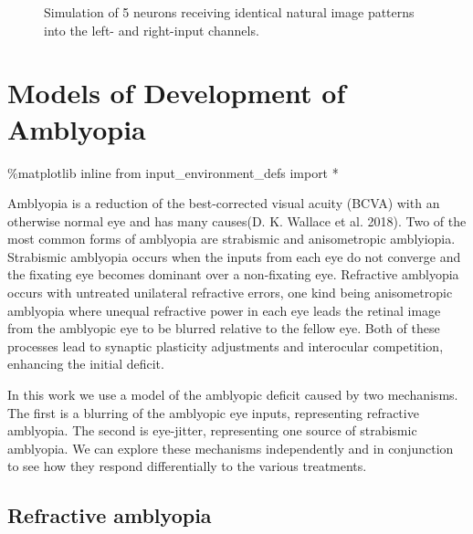 \documentclass[
  letterpaper,
  DIV=11,
  numbers=noendperiod]{scrreprt}
\newenvironment{Shaded}{\begin{snugshade}}{\end{snugshade}}
\newcommand{\ImportTok}[1]{\textcolor[rgb]{0.00,0.46,0.62}{#1}}
\newcommand{\NormalTok}[1]{\textcolor[rgb]{0.00,0.23,0.31}{#1}}
\newcommand{\OperatorTok}[1]{\textcolor[rgb]{0.37,0.37,0.37}{#1}}
\begin{document}
\begin{figure}
\begin{minipage}[t]{\linewidth}
{{}

}

\end{minipage}%

\caption{\label{fig-nr_sim}Simulation of 5 neurons receiving identical
natural image patterns into the left- and right-input channels.}

\end{figure}

\hypertarget{sec-models-of-development}{%
\chapter{Models of Development of
Amblyopia}\label{sec-models-of-development}}

\begin{Shaded}
\begin{Highlighting}[]
\OperatorTok{\%}\NormalTok{matplotlib inline}
\ImportTok{from}\NormalTok{ input\_environment\_defs }\ImportTok{import} \OperatorTok{*}
\end{Highlighting}
\end{Shaded}

Amblyopia is a reduction of the best-corrected visual acuity (BCVA) with
an otherwise normal eye and has many causes(D. K. Wallace et al. 2018).
Two of the most common forms of amblyopia are strabismic and
anisometropic amblyiopia. Strabismic amblyopia occurs when the inputs
from each eye do not converge and the fixating eye becomes dominant over
a non-fixating eye. Refractive amblyopia occurs with untreated
unilateral refractive errors, one kind being anisometropic amblyopia
where unequal refractive power in each eye leads the retinal image from
the amblyopic eye to be blurred relative to the fellow eye. Both of
these processes lead to synaptic plasticity adjustments and interocular
competition, enhancing the initial deficit.

In this work we use a model of the amblyopic deficit caused by two
mechanisms. The first is a blurring of the amblyopic eye inputs,
representing refractive amblyopia. The second is eye-jitter,
representing one source of strabismic amblyopia. We can explore these
mechanisms independently and in conjunction to see how they respond
differentially to the various treatments.

\hypertarget{refractive-amblyopia}{%
\section{Refractive amblyopia}\label{refractive-amblyopia}}
\end{document}
